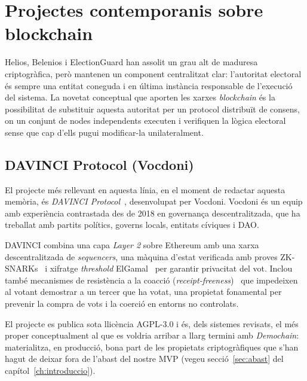 

\section{Projectes contemporanis sobre blockchain}
\label{sec:projectes-blockchain}

Helios, Belenios i ElectionGuard han assolit un grau alt de maduresa criptogràfica, però mantenen un component
centralitzat clar: l'autoritat electoral és sempre una entitat coneguda i en última instància responsable de l'execució
del sistema.
La novetat conceptual que aporten les xarxes \emph{blockchain} és la possibilitat de substituir aquesta autoritat per un
protocol distribuït de consens, on un conjunt de nodes independents executen i verifiquen la lògica electoral sense que
cap d'ells pugui modificar-la unilateralment.

\subsection{DAVINCI Protocol (Vocdoni)}
\label{subsec:davinci-protocol-(vocdoni)}

El projecte més rellevant en aquesta línia, en el moment de redactar aquesta memòria, és \emph{DAVINCI
Protocol}~\cite{vocdoni2026davinci}, desenvolupat per Vocdoni.
Vocdoni és un equip amb experiència contrastada des de 2018 en governança descentralitzada, que ha treballat amb partits
polítics, governs locals, entitats cíviques i DAO\@.

DAVINCI combina una capa \emph{Layer 2} sobre Ethereum amb una xarxa descentralitzada de \emph{sequencers}, una màquina
d'estat verificada amb proves \acp{ZK-SNARK}~\cite{goldwasser1989knowledge,groth2016size} i xifratge \emph{threshold} ElGamal~\cite{elgamal1985public} per garantir privacitat del vot.
Inclou també mecanismes de resistència a la coacció (\emph{receipt-freeness})~\cite{benaloh1994receiptfree} que impedeixen al votant demostrar a un
tercer que ha votat, una propietat fonamental per prevenir la compra de vots i la coerció en entorns no controlats.

El projecte es publica sota llicència AGPL-3.0 i és, dels sistemes revisats, el més proper conceptualment al que es
voldria arribar a llarg termini amb \emph{Demochain}: materialitza, en producció, bona part de les propietats
criptogràfiques que s'han hagut de deixar fora de l'abast del nostre \ac{MVP} (vegeu secció~\ref{sec:abast} del
capítol~\ref{ch:introduccio}).

